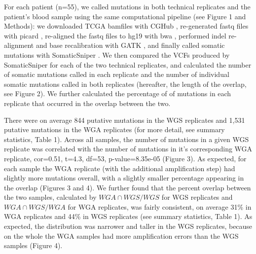 \documentclass[11pt]{article} %
\begin{document}
For each patient (n=55), we called mutations in both technical replicates and the patient's blood sample using the same computational pipeline (see Figure 1 and Methods): we downloaded TCGA bamfiles with CGHub \citep{CGHub}, re-generated fastq files with picard \citep{picard}, re-aligned the fastq files to hg19 with bwa \citep{bwa}, performed indel re-alignment and base recalibration with GATK \citep{GATK}, and finally called somatic mutations with SomaticSniper \citep{SomaticSniper}. We then compared the VCFs produced by SomaticSniper for each of the two technical replicates, and calculated the number of somatic mutations called in each replicate and the number of individual somatic mutations called in both replicates (hereafter, the length of the overlap, see Figure 2). We further calculated the percentage of of mutations in each replicate that occurred in the overlap between the two. 

There were on average 844 putative mutations in the WGS replicates and 1,531 putative mutations in the WGA replicates (for more detail, see summary statistics, Table 1). Across all samples, the number of mutations in a given WGS replicate was correlated with the number of mutations in it's corresponding WGA replicate, cor=0.51, t=4.3, df=53, p-value=8.35e-05 (Figure 3). As expected, for each sample the WGA replicate (with the additional amplification step) had slightly more mutations overall, with a slightly smaller percentage appearing in the overlap (Figures 3 and 4). We further found that the percent overlap between the two samples, calculated by $WGA \cap WGS/WGS$ for WGS replicates and $WGA \cap WGS/WGA$ for WGA replicates, was fairly consistent, on average 31\% in WGA replicates and 44\% in WGS replicates (see summary statistics, Table 1). As expected, the distribution was narrower and taller in the WGS replicates, because on the whole the WGA samples had more amplification errors than the WGS samples (Figure 4).
\end{document}
